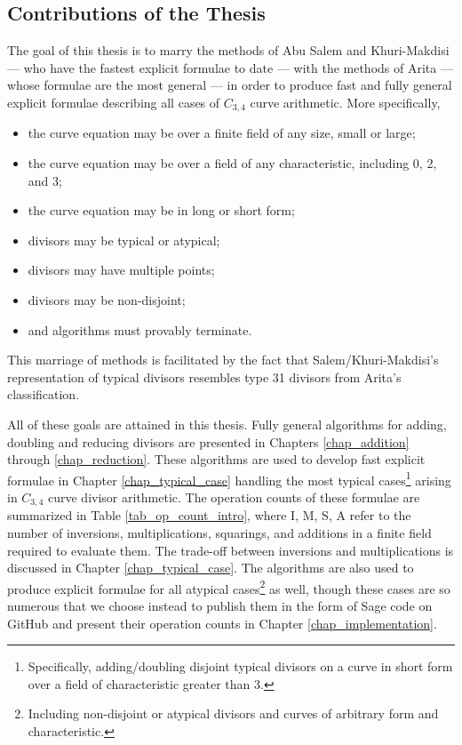 
\subsection{Contributions of the Thesis}

The goal of this thesis is to marry the methods of Abu Salem and Khuri-Makdisi ---
who have the fastest explicit formulae to date ---
with the methods of Arita --- whose formulae are the most general ---
in order to produce fast and fully general explicit formulae describing all cases of $C_{3,4}$ curve arithmetic.
More specifically,
\begin{itemize}[itemsep=0pt]
  \item the curve equation may be over a finite field of any size, small or large;
  \item the curve equation may be over a field of any characteristic, including 0, 2, and 3;
  \item the curve equation may be in long or short form;
  \item divisors may be typical or atypical;
  \item divisors may have multiple points;
  \item divisors may be non-disjoint;
  \item and algorithms must provably terminate.
\end{itemize}
This marriage of methods is facilitated by the fact that Salem/Khuri-Makdisi's representation of typical divisors resembles type 31 divisors from Arita's classification.

All of these goals are attained in this thesis.
Fully general algorithms for adding, doubling and reducing divisors are presented in
Chapters \ref{chap_addition} through \ref{chap_reduction}.
These algorithms are used to develop fast explicit formulae in Chapter \ref{chap_typical_case}
handling the most typical cases\footnote{
Specifically, adding/doubling disjoint typical divisors on a curve in short form over a field of characteristic greater than 3.}
arising in $C_{3,4}$ curve divisor arithmetic.
The operation counts of these formulae are summarized in Table \ref{tab_op_count_intro},
where I, M, S, A refer to the number of inversions, multiplications, squarings, and additions in a finite field required to evaluate them.
The trade-off between inversions and multiplications is discussed in Chapter \ref{chap_typical_case}.
The algorithms are also used to produce explicit formulae for all atypical cases\footnote{
Including non-disjoint or atypical divisors and curves of arbitrary form and characteristic.}
as well,
though these cases are so numerous that we choose instead to publish them in the form of Sage code
on GitHub \cite{github} and present their operation counts in Chapter \ref{chap_implementation}.

